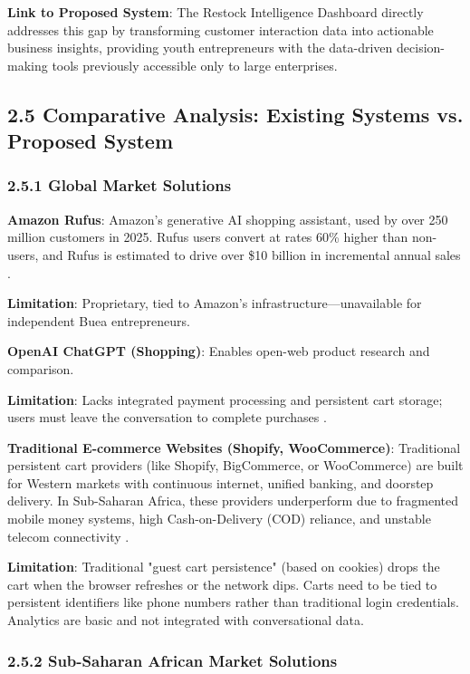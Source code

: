 \documentclass[12pt,a4paper]{article}
\begin{document}
\textbf{Link to Proposed System}: The Restock Intelligence Dashboard directly addresses this gap by transforming customer interaction data into actionable business insights, providing youth entrepreneurs with the data-driven decision-making tools previously accessible only to large enterprises.

\subsection{2.5 Comparative Analysis: Existing Systems vs. Proposed System}

\subsubsection{2.5.1 Global Market Solutions}

\textbf{Amazon Rufus}: Amazon's generative AI shopping assistant, used by over 250 million customers in 2025. Rufus users convert at rates 60\% higher than non-users, and Rufus is estimated to drive over \$10 billion in incremental annual sales \citep{amazon2025}.

\textbf{Limitation}: Proprietary, tied to Amazon's infrastructure---unavailable for independent Buea entrepreneurs.

\textbf{OpenAI ChatGPT (Shopping)}: Enables open-web product research and comparison.

\textbf{Limitation}: Lacks integrated payment processing and persistent cart storage; users must leave the conversation to complete purchases \citep{openai2025}.

\textbf{Traditional E-commerce Websites (Shopify, WooCommerce)}: Traditional persistent cart providers (like Shopify, BigCommerce, or WooCommerce) are built for Western markets with continuous internet, unified banking, and doorstep delivery. In Sub-Saharan Africa, these providers underperform due to fragmented mobile money systems, high Cash-on-Delivery (COD) reliance, and unstable telecom connectivity \citep{adroll2026}.

\textbf{Limitation}: Traditional "guest cart persistence" (based on cookies) drops the cart when the browser refreshes or the network dips. Carts need to be tied to persistent identifiers like phone numbers rather than traditional login credentials. Analytics are basic and not integrated with conversational data.

\subsubsection{2.5.2 Sub-Saharan African Market Solutions}
\end{document}
